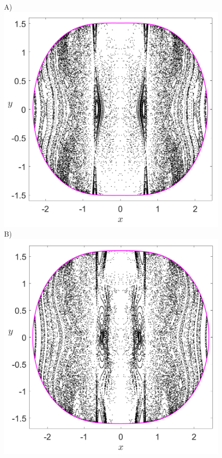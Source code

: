 \documentclass[10pt,aps,onecolumn,superscriptaddress]{revtex4-2}
\begin{document}
\begin{figure}[htbp]
	A)\includegraphics[scale=0.3]{PS_px_0_H_-0_2_w0_1div2_k_sqrt7_min_5delta_d_1.png}
	B)\includegraphics[scale=0.3]{PS_px_0_H_-0_2_w0_1div2_k_sqrt7_min_4delta_d_1.png}	

\end{figure}
\end{document}
